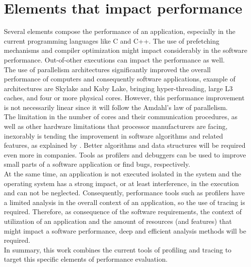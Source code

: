 \section{Elements that impact performance}  %
Several elements compose the performance of an application, especially in the current programming languages like C and C++. The use of prefetching mechanisms and compiler optimization might impact considerably in the software performance. Out-of-other executions can impact the performance as well.\\
The use of parallelism architectures significantly improved the overall performance of computers and consequently software applications, example of architectures are Skylake and Kaby Lake, bringing hyper-threading, large L3 caches, and four or more physical cores. However, this performance improvement is not necessarily linear since it will follow the Amdahl's law of parallelism. \\
The limitation in the number of cores and their communication procedures, as well as other hardware limitations that processor manufacturers are facing, inexorably is tending the improvement in software algorithms and related features, as explained by \cite{limitations}. Better algorithms and data structures will be required even more in companies. Tools as profilers and debuggers can be used to improve small parts of a software application or find bugs, respectively.\\
At the same time, an application is not executed isolated in the system and the operating system has a strong impact, or at least interference, in the execution and can not be neglected. Consequently, performance tools such as profilers have a limited analysis in the overall context of an application, so the use of tracing is required.
Therefore, as consequence of the software requirements, the context of utilization of an application and the amount of resources (and features) that might impact a software performance, deep and efficient analysis methods will be required. \\
In summary, this work combines the current tools of profiling and tracing to target this specific elements of performance evaluation.

